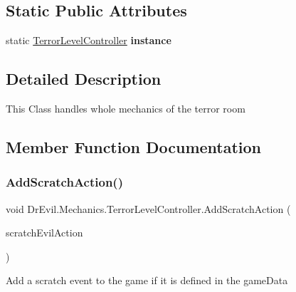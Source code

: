 \subsection*{Static Public Attributes}
\begin{DoxyCompactItemize}
\item 
\mbox{\label{class_dr_evil_1_1_mechanics_1_1_terror_level_controller_a7291cb2b49c2e1153262c70e09915d45}} 
static \mbox{\hyperlink{class_dr_evil_1_1_mechanics_1_1_terror_level_controller}{Terror\+Level\+Controller}} {\bfseries instance}
\end{DoxyCompactItemize}


\subsection{Detailed Description}
This Class handles whole mechanics of the terror room 



\subsection{Member Function Documentation}
\mbox{\label{class_dr_evil_1_1_mechanics_1_1_terror_level_controller_a8d383e0849fbd683b2032658a751a783}} 
\subsubsection{\texorpdfstring{Add\+Scratch\+Action()}{AddScratchAction()}}
{\footnotesize\ttfamily void Dr\+Evil.\+Mechanics.\+Terror\+Level\+Controller.\+Add\+Scratch\+Action (\begin{DoxyParamCaption}\item[{\mbox{\hyperlink{class_evil_action}{Evil\+Action}}}]{scratch\+Evil\+Action }\end{DoxyParamCaption})\hspace{0.3cm}{\ttfamily [inline]}}



Add a scratch event to the game if it is defined in the game\+Data 


